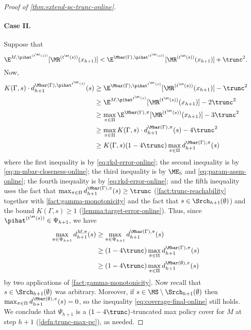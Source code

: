 \begin{proof}[Proof of \cref{thm:extend-pc-trunc-online}]
\paragraph{Case II.} Suppose that
\begin{equation} \E^{M,\pihat^{(t^\st(s))}}[\MR^{(t^\st(s))}(x_{h+1})] < \E^{\Mbar(\Gamma),\pihat^{(t^\st(s))}}[\MR^{(t^\st(s))}(x_{h+1})] + \trunc^2.\label{eq:m-mbar-closeness-online}\end{equation}
Now, 
\begin{align*}
K(\Gamma, s) \cdot d^{\Mbar(\Gamma), \pihat^{t^\st(s)}}_{h+1}(s) 
&\geq \E^{\Mbar(\Gamma),\pihat^{t^\st(s)}}[\MR^{(t^\st(s))}(x_{h+1})] - \trunc^2 \\ 
&\geq \E^{M,\pihat^{t^\st(s)}}[\MR^{(t^\st(s))}(x_{h+1})] - 2\trunc^2 \\ 
&\geq \max_{\pi\in\Pi} \E^{\Mbar(\Gamma),\pi}[\MR^{(t^\st(s))}(x_{h+1})] -  3\trunc^2 \\ 
&\geq \max_{\pi\in\Pi} K(\Gamma,s) \cdot d^{\Mbar(\Gamma),\pi}_{h+1}(s) -  4\trunc^2 \\
&\geq K(\Gamma,s) (1-4\trunc) \max_{\pi\in\Pi} d^{\Mbar(\Gamma),\pi}_{h+1}(s)
\end{align*}
where the first inequality is by \cref{eq:rkd-error-online}; the second inequality is by \cref{eq:m-mbar-closeness-online}; the third inequality is by $\ME_5$ and \cref{eq:param-assm-online}; the fourth inequality is by \cref{eq:rkd-error-online}; and the fifth inequality uses the fact that $\max_{\pi\in\Pi} d^{\Mbar(\Gamma),\pi}_{h+1}(s) \geq \trunc$ (\cref{fact:trunc-reachability} together with \cref{fact:gamma-monotonicity} and the fact that $s \in \Srch_{h+1}(\emptyset)$) and the bound $K(\Gamma,s) \geq 1$ (\cref{lemma:target-error-online}). Thus, since $\pihat^{(t^\st(s))} \in \Psi_{h+1}$, we have
\begin{align}
\max_{\pi\in\Psi_{h+1}} d^{M,\pi}_{h+1}(s) 
&\geq \max_{\pi\in\Psi_{h+1}} d^{\Mbar(\Gamma),\pi}_{h+1}(s) \nonumber\\ 
&\geq (1-4\trunc)\max_{\pi\in\Pi} d^{\Mbar(\Gamma),\pi}_{h+1}(s) \nonumber\\ 
&\geq (1-4\trunc)\max_{\pi\in\Pi} d^{\Mbar(\emptyset),\pi}_{h+1}(s)
\label{eq:coverage-final-online}
\end{align}
by two applications of \cref{fact:gamma-monotonicity}. Now recall that $s \in \Srch_{h+1}(\emptyset)$ was arbitrary. Moreover, if $s \in \MS\setminus \Srch_{h+1}(\emptyset)$ then $\max_{\pi\in\Pi} d^{\Mbar(\emptyset),\pi}_{h+1}(s) = 0$, so the inequality \cref{eq:coverage-final-online} still holds. We conclude that $\Psi_{h+1}$ is a $(1-4\trunc)$-truncated max policy cover for $M$ at step $h+1$ (\cref{defn:trunc-max-pc}), as needed.
\end{proof}

